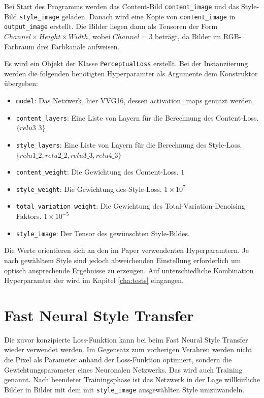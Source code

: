 Bei Start des Programms werden das Content-Bild \lstinline{content_image} und das Style-Bild \lstinline{style_image} geladen. Danach wird eine Kopie von \lstinline{content_image} in \lstinline{output_image} erstellt. Die Bilder liegen dann als Tensoren der Form $ Channel \times Height \times Width $, wobei $ Channel = 3 $ beträgt, da Bilder im RGB-Farbraum drei Farbkanäle aufweisen.

Es wird ein Objekt der Klasse \lstinline{PerceptualLoss} erstellt. Bei der Instanziierung werden die folgenden benötigten Hyperparamter als Argumente dem Konstruktor übergeben:

\begin{itemize}
	\item \lstinline{model}: Das Netzwerk, hier VVG16, dessen \gls{activation_map}s genutzt werden.
	\item \lstinline{content_layers}: Eine Liste von Layern für die Berechnung des Content-Loss.\\ $ \{ relu3\_3 \} $
	\item \lstinline{style_layers}: Eine Liste von Layern für die Berechnung des Style-Loss.\\ $ \{ relu1\_2, relu2\_2, relu3\_3, relu4\_3 \} $
	\item \lstinline{content_weight}: Die Gewichtung des Content-Loss. $ 1 $ 
	\item \lstinline{style_weight}: Die Gewichtung des Style-Loss. $ 1 \times 10^{7} $
	\item \lstinline{total_variation_weight}: Die Gewichtung des Total-Variation-Denoising Faktors. $ 1 \times 10^{-5} $
	\item \lstinline{style_image}: Der Tensor des gewünschten Style-Bildes.
\end{itemize}

Die Werte orientieren sich an den im Paper \cite{DBLP:journals/corr/JohnsonAL16} verwendenten Hyperparamtern. Je nach gewähltem Style sind jedoch abweichenden Einstellung erforderlich um optisch ansprechende Ergebnisse zu erzeugen. Auf unterschiedliche Kombination Hyperparamter der wird im Kapitel \ref{cha:tests} eingangen.

\section{Fast Neural Style Transfer}

Die zuvor konzipierte Loss-Funktion kann bei beim Fast Neural Style Transfer wieder verwendet werden. 
Im Gegensatz zum vorherigen Verahren werden nicht die Pixel als Parameter anhand der Loss-Funktion optimiert, sondern die Gewichtungsparameter eines Neuronalen Netzwerks. Das wird auch Training genannt. Nach beendeter Trainingsphase ist das Netzwerk in der Lage willkürliche Bilder in Bilder mit dem mit \lstinline{style_image} ausgewählten Style umzuwandeln.

